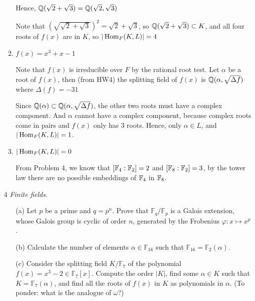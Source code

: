 \documentclass[12pt]{article}
\begin{document}
\begin{solution}
\begin{enumerate}
        Hence, $ \Q(\sqrt{2} + \sqrt{3})= \Q(\sqrt{2}, \sqrt{3})$

        Note that $(\sqrt{\sqrt{2} + \sqrt{3}})^2 = \sqrt{2} + \sqrt{3}$, so  $\Q(\sqrt{2} + \sqrt{3}) \subset K$, and all four roots of $f(x)$ are in $K$, so $|\Hom_F(K,L)| =4$

        \item $f(x) = x^3 + x - 1$
        
        Note that $f(x)$ is irreducible over $F$ by the rational root test. Let $\alpha$ be a root of $f(x)$, then (from HW4) the splitting field of $f(x)$ is $\mathbb Q(\alpha, \sqrt{\Delta f})$ where $\Delta(f) = -31$

        Since $\mathbb Q(\alpha) \subset \mathbb Q(\alpha, \sqrt{\Delta f})$, the other two roots must have a complex component. And $\alpha$ cannot have a complex component, because complex roots come in pairs and $f(x)$ only has $3$ roots. Hence, only $\alpha \in L$, and $|\operatorname{Hom}_F(K, L)| = 1$. 

        \item $|\operatorname{Hom}_F(K, L)| = 0$
        
        From Problem 4, we know that $[\mathbb F_4: \mathbb F_2] = 2$ and $[\mathbb F_8: \mathbb F_2] = 3$, by the tower law there are no possible embeddings of $\mathbb F_4$ in $\mathbb F_8$. 
    \end{enumerate}
\end{solution}


\newpage

\begin{problem}{4}
\textit{Finite fields.}
\begin{enumerate}
    \item[(a)] Let $p$ be a prime and $q=p^n$. Prove that $\mathbb{F}_q/\mathbb{F}_p$ is a Galois extension,
    whose Galois group is cyclic of order $n$, generated by the Frobenius $\varphi:x\mapsto x^p$.

    \item[(b)] Calculate the number of elements $\alpha\in\mathbb{F}_{16}$ such that
    $\mathbb{F}_{16}=\mathbb{F}_2(\alpha)$.

    \item[(c)] Consider the splitting field $K/\mathbb{F}_7$ of the polynomial
    $f(x)=x^3-2\in\mathbb{F}_7[x]$. Compute the order $|K|$, find some $\alpha\in K$ such that
    $K=\mathbb{F}_7(\alpha)$, and find all the roots of $f(x)$ in $K$ as polynomials in $\alpha$.
    (To ponder: what is the analogue of $\omega$?)
\end{enumerate}
\end{problem}
\end{document}

